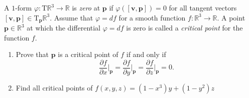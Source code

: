 \documentclass[12 pt, letterpaper]{hmcpset}
\begin{document}
\begin{problem}[Problem 3]
	A $1$-form $\varphi : \mathrm T \mathbb R^3 \to \mathbb R$ is \textit{zero} at $\mathbf p$ if $\varphi([\mathbf v, \mathbf p]) = 0$ for all tangent vectors $[\mathbf v, \mathbf p] \in \mathrm T_{\mathbf p} \mathbb R^3$. Assume that $\varphi = df$ for a smooth function $f : \mathbb R^3 \to \mathbb R$. A point $\mathbf p \in \mathbb R^3$ at which the differential $\varphi = df$ is zero is called a \textit{critical point} for the function $f$.
	\begin{enumerate}
		\item Prove that $\mathbf p$ is a critical point of $f$ if and only if 
			\[
				\frac{\partial f}{\partial x} \Big |_{\mathbf p} = \frac{\partial f}{\partial y} \Big |_{\mathbf p} = \frac{\partial f}{\partial z} \Big |_{\mathbf p} = 0.
			\]
		\item Find all critical points of $f(x, y, z) = (1 - x^3) y + (1 - y^2) z$
	\end{enumerate}
\end{problem}
\end{document}
